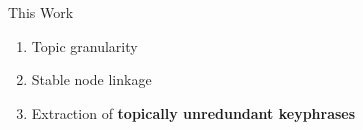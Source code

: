   \begin{frame}{This Work}
    \begin{enumerate}
      \item{Topic granularity}
      \item{Stable node linkage}
      \item{Extraction of \textbf{topically unredundant keyphrases}}
    \end{enumerate}
  \end{frame}

